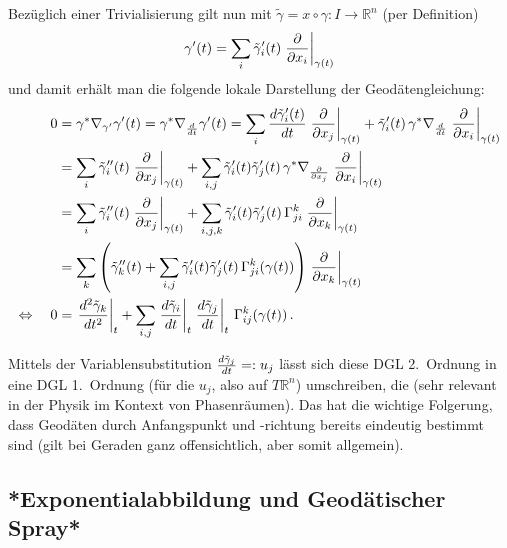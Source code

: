 \documentclass[../H_Analysis_main.tex]{subfiles}
\begin{document}
Bezüglich einer Trivialisierung gilt nun mit $\tilde{\gamma} = x \circ \gamma: I \rightarrow \mathbb{R}^n$ (per Definition)
\begin{equation*}
\gamma'(t) = \sum_i \tilde{\gamma}_i'(t) \eval{\pdv{x_i}}_{\gamma(t)}
\end{equation*}
und damit erhält man die folgende lokale Darstellung der Geodätengleichung:
\begin{align}
0 &= \gamma^* \nabla_{\gamma'} \gamma'(t) = \gamma^* \nabla_{\dv{t}} \gamma'(t) = \sum_i \dv{\tilde{\gamma}_i'(t)}{t} \eval{\pdv{x_j}}_{\gamma(t)} + \tilde{\gamma}_i'(t) \, \gamma^* \nabla_{\dv{t}} \eval{\pdv{x_i}}_{\gamma(t)}
\notag\\
&= \sum_i \tilde{\gamma}_i''(t) \eval{\pdv{x_j}}_{\gamma(t)} + \sum_{i, j} \tilde{\gamma}_i'(t) \tilde{\gamma}_j'(t) \, \gamma^* \nabla_{\pdv{x_j}} \eval{\pdv{x_i}}_{\gamma(t)}
\notag\\
&= \sum_i \tilde{\gamma}_i''(t) \eval{\pdv{x_j}}_{\gamma(t)} + \sum_{i, j, k} \tilde{\gamma}_i'(t) \tilde{\gamma}_j'(t) \, \Gamma_{ji}^k \eval{\pdv{x_k}}_{\gamma(t)}
\notag\\
&= \sum_k \qty(\tilde{\gamma}_k''(t) + \sum_{i, j} \tilde{\gamma}_i'(t) \tilde{\gamma}_j'(t) \, \Gamma_{ji}^k(\gamma(t))) \eval{\pdv{x_k}}_{\gamma(t)}
\notag\\
\Leftrightarrow \quad 0 &= \eval{\dv[2]{\tilde{\gamma}_k}{t}}_t + \sum_{i, j} \eval{\dv{\tilde{\gamma}_i}{t}}_t \eval{\dv{\tilde{\gamma}_j}{t}}_t \, \Gamma_{ij}^k(\gamma(t)) \, .
\end{align}

Mittels der Variablensubstitution $\dv{\tilde{\gamma}_j}{t} =: u_j$ lässt sich diese DGL 2.~Ordnung in eine DGL 1.~Ordnung (für die $u_j$, also auf $T \mathbb{R}^n$) umschreiben, die  (sehr relevant in der Physik im Kontext von Phasenräumen). Das hat die wichtige Folgerung, dass Geodäten durch Anfangspunkt und -richtung bereits eindeutig bestimmt sind (gilt bei Geraden ganz offensichtlich, aber somit allgemein).\\



		\subsection{*Exponentialabbildung und Geodätischer Spray*}
\end{document}
